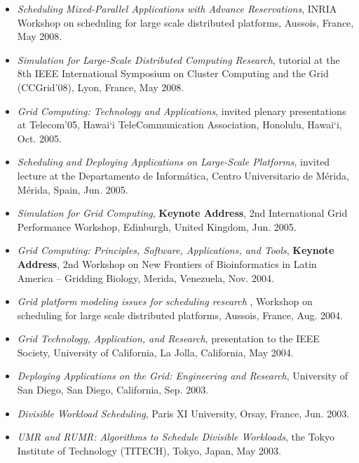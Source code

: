 \documentclass[times,11pt]{letter}
\begin{document}
\begin{itemize}
\item [-] {\it Scheduling Mixed-Parallel Applications with Advance
Reservations}, INRIA Workshop on scheduling for large scale distributed
platforms, Aussois, France, May 2008.

\item [-] {\it Simulation for Large-Scale Distributed Computing Research},
tutorial at the 8th IEEE International Symposium on Cluster Computing and the Grid (CCGrid'08), Lyon, France, May 2008.

\item [-] {\it Grid Computing: Technology and Applications}, invited
plenary presentations at Telecom'05, Hawai`i TeleCommunication Association,
Honolulu, Hawai`i, Oct. 2005.

\item [-] {\it Scheduling and Deploying Applications on Large-Scale
Platforms}, invited lecture at the Departamento de Inform\'atica, Centro
Universitario de M\'erida, M\'erida, Spain, Jun. 2005.

\item [-] {\it Simulation for Grid Computing}, {\bf Keynote Address},
2nd International Grid Performance Workshop, Edinburgh, United Kingdom,
Jun. 2005.

\item [-] {\it Grid Computing: Principles, Software, Applications, and Tools},
{\bf Keynote Address}, 2nd Workshop on New Frontiers of Bioinformatics in Latin America -- Gridding
Biology, Merida, Venezuela, Nov. 2004.

\item [-] {\it Grid platform modeling issues for scheduling research },
Workshop on scheduling for large scale distributed platforms, Aussois,
France, Aug. 2004.

\item [-] {\it Grid Technology, Application, and Research}, presentation 
to the IEEE Society, University of California, La Jolla, California, May 2004.

\item [-] {\it Deploying Applications on the Grid: Engineering and
Research}, University of San Diego, San Diego, California, Sep. 2003.

\item [-] {\it Divisible Workload Scheduling}, Paris XI University,
Orsay, France, Jun. 2003.

\item [-] {\it UMR and RUMR: Algorithms to Schedule Divisible Workloads},
the Tokyo Institute of Technology (TITECH), Tokyo, Japan, 
May 2003.


\end{itemize}
\end{document}
